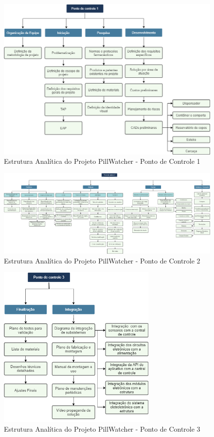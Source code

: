 \begin{apendicesenv}
\begin{figure}[H]
    \centering
    \includegraphics[width=\textwidth]{figuras/eap_pc1.png}
    \caption{Estrutura Analítica do Projeto PillWatcher - Ponto de Controle 1 }
    \label{fig:eap_pc1}
\end{figure}

\begin{figure}[H]
    \centering
    \includegraphics[scale=0.35, angle=90]{figuras/eap_pc2.png}
    \caption{Estrutura Analítica do Projeto PillWatcher - Ponto de Controle 2 }
    \label{fig:eap_pc2}
\end{figure}

\begin{figure}[H]
    \centering
    \includegraphics[width=0.7\textwidth]{figuras/eap_pc3.png}
    \caption{Estrutura Analítica do Projeto PillWatcher - Ponto de Controle 3 }
    \label{fig:eap_pc3}
\end{figure}


\end{apendicesenv}
